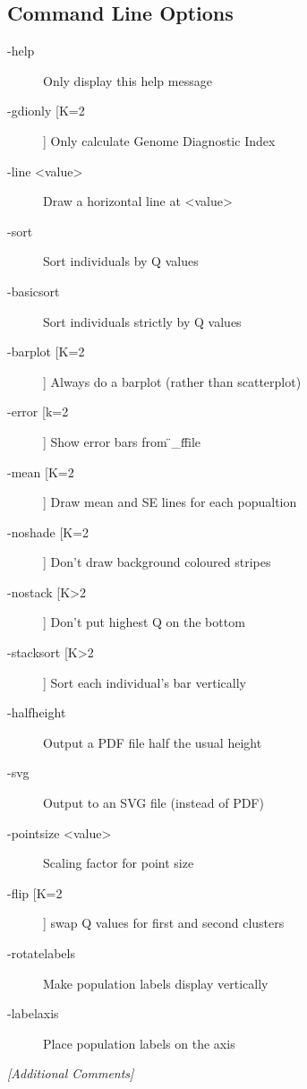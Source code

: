 \subsection{Command Line Options}
\label{sec:structure2pdf.r-command-line}

\begin{description}
\item[-help] Only display this help message
\item[-gdionly   [K=2]] Only calculate Genome Diagnostic Index
\item[-line <value>] Draw a horizontal line at <value>
\item[-sort] Sort individuals by Q values
\item[-basicsort] Sort individuals strictly by Q values
\item[-barplot   [K=2]] Always do a barplot (rather than scatterplot)
\item[-error     [k=2]] Show error bars from \"_f\" file
\item[-mean      [K=2]] Draw mean and SE lines for each popualtion
\item[-noshade   [K=2]] Don't draw background coloured stripes
\item[-nostack   [K>2]] Don't put highest Q on the bottom
\item[-stacksort [K>2]] Sort each individual's bar vertically
\item[-halfheight] Output a PDF file half the usual height
\item[-svg] Output to an SVG file (instead of PDF)
\item[-pointsize <value>] Scaling factor for point size
\item[-flip      [K=2]] swap Q values for first and second clusters
\item[-rotatelabels] Make population labels display vertically
\item[-labelaxis] Place population labels on the axis
\end{description}

\emph{[Additional Comments]}

